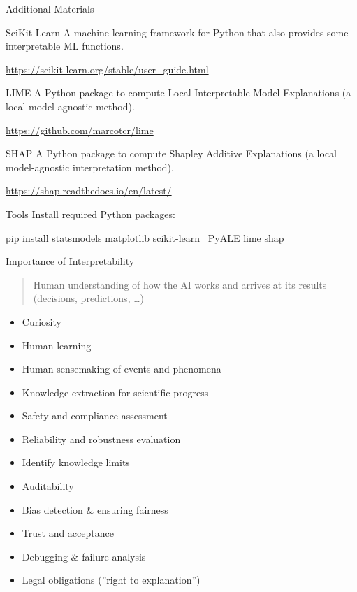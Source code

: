 \documentclass[ignorenonframetext,xcolor=x11names]{beamer}
\begin{document}
\begin{frame}{Additional Materials}
\small
\begin{block}{SciKit Learn}
A machine learning framework for Python that also provides some interpretable ML functions.

\url{https://scikit-learn.org/stable/user_guide.html}
\end{block}

\begin{block}{LIME}
A Python package to compute Local Interpretable Model Explanations (a local model-agnostic method).

\url{https://github.com/marcotcr/lime}
\end{block}
\begin{block}{SHAP}
A Python package to compute Shapley Additive Explanations (a local model-agnostic interpretation method).

\url{https://shap.readthedocs.io/en/latest/}
\end{block}
\end{frame}

\begin{frame}[fragile]{Tools}
Install required Python packages:
\begin{bashcode}
pip install statsmodels matplotlib scikit-learn \
    PyALE lime shap
\end{bashcode}
\end{frame}


\begin{frame}{Importance of Interpretability}

\begin{quote} \large
Human understanding of how the AI works and arrives at its results (decisions, predictions, \ldots)
\end{quote}

\footnotesize
\begin{itemize}
\item Curiosity
\item Human learning
\item Human sensemaking of events and phenomena
\item Knowledge extraction for scientific progress
\item Safety and compliance assessment
\item Reliability and robustness evaluation
\item Identify knowledge limits
\item Auditability
\item Bias detection \& ensuring fairness
\item Trust and acceptance
\item Debugging \& failure analysis
\item Legal obligations (''right to explanation'')
\end{itemize}
\end{frame}
\end{document}
